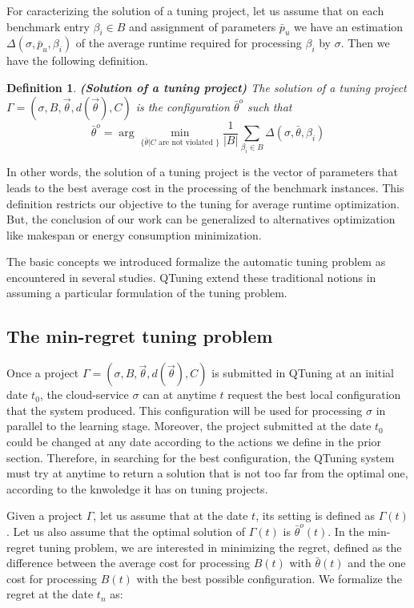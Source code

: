 \documentclass[10pt, conference, compsocconf]{IEEEtran}
\newtheorem{definition}[theorem]{Definition}
\begin{document}
For caracterizing the solution of a tuning project, let us assume that on each benchmark entry $\beta_i \in B$ 
and assignment of parameters $\bar{p}_u$ we have an estimation $\Delta(\sigma, \bar{p}_u, \beta_i)$ of the 
average runtime required for processing $\beta_i$ by $\sigma$. Then we have the following definition.

\begin{definition}{\bf (Solution of a tuning project)}
The solution of a tuning project $ \Gamma = (\sigma, B, \vec{\theta}, d(\vec{\theta}), C)$  is the configuration 
$\bar{\theta}^o$ such that \[ \bar{\theta}^o = \arg \underset{\{\bar{\theta} | C \text{ are not violated }\}}{\min} \frac{1}{|B|}\sum_{\beta_i \in B} \Delta(\sigma, \bar{\theta}, \beta_i) \] 
\end{definition}

In other words, the solution of a tuning project is the vector of parameters that leads to the best average 
cost in the processing of the benchmark instances. This definition restricts our objective to the tuning for average runtime 
optimization. But, the conclusion of our work can be generalized to alternatives optimization like makespan or energy 
consumption minimization.  

The basic concepts we introduced formalize the automatic tuning problem as encountered in several studies. 
QTuning extend these traditional notions in assuming a particular formulation of the tuning problem. 

\subsection{The min-regret tuning problem}

Once a project $ \Gamma = (\sigma, B, \vec{\theta}, d(\vec{\theta}), C)$ is submitted in QTuning at an initial 
date $t_0$, the cloud-service $\sigma$ can at anytime $t$ request the best local configuration that the 
system produced. This configuration will be used for processing $\sigma$ in parallel to the  learning stage. 
Moreover, the project submitted at the date $t_0$ could be changed at any date according to the actions we define 
in the prior section. Therefore, in searching for the best configuration, the QTuning system must try at anytime 
to return a solution that is not too far from the optimal one, according to the knwoledge it has on tuning projects. 

Given a project $\Gamma$, let us assume that at the date $t$, its setting is defined as $\Gamma(t)$. 
Let us also assume that the optimal solution of $\Gamma(t)$ is $\bar{\theta}^o(t)$. 
In the min-regret tuning problem, we are interested in minimizing the regret, defined as the 
difference between the average cost for processing $B(t)$ with $\bar{\theta}(t)$ and the one cost for 
processing $B(t)$ with the best possible configuration. We formalize the regret at the date $t_n$ as: 
\end{document}
